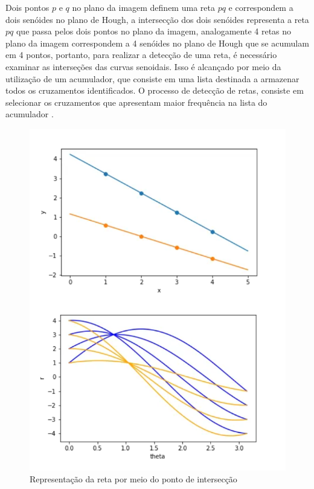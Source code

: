 Dois pontos $p$ e $q$ no plano da imagem definem uma reta $pq$ e correspondem a dois senóides no plano de Hough, a intersecção dos dois senóides representa a reta $pq$ que
passa pelos dois pontos no plano da imagem, analogamente 4 retas no plano da imagem correspondem a 4 senóides no plano de Hough que se acumulam em 4 pontos, portanto, para realizar a detecção de uma reta, é necessário examinar as interseções das curvas senoidais. Isso é alcançado por meio da utilização de um acumulador, que consiste em uma lista destinada a armazenar todos os cruzamentos identificados. O processo de detecção de retas, consiste em selecionar os cruzamentos que apresentam maior frequência na lista do acumulador \cite{transformadaHough2}.
\newpage
\begin{figure}[!htb]
	\centering
	\includegraphics[scale=0.5]{figuras/math/senoidesIterseccao.png}
	\caption{Representação da reta por meio do ponto de intersecção}
	\label{fig:Representacao da reta por meio do ponto de interseccao}
\end{figure}





